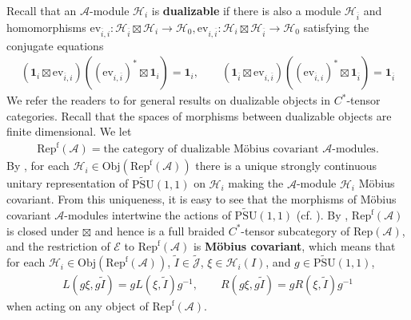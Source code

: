 \documentclass[11pt,b5paper,notitlepage]{article}
\theoremstyle{definition}
\theoremstyle{plain}
\newcommand{\mc}{\mathcal}
\newcommand{\wtd}{\widetilde}
\newcommand{\ovl}{\overline}
\newcommand{\id}{\mathbf{1}}
\newcommand{\ev}{\mathrm{ev}}
\newcommand{\opp}{\mathrm{opp}}
\newcommand{\scr}{\mathscr}
\newcommand{\Jtd}{\widetilde{\mathcal J}}
\newcommand{\RepA}{\mathrm{Rep}(\mathcal A)}
\newcommand{\RepfA}{\mathrm{Rep}^{\mathrm f}(\mathcal A)}
\newcommand{\UPSU}{\widetilde{\mathrm{PSU}}(1,1)}
\newcommand{\Obj}{\mathrm{Obj}}
\numberwithin{equation}{section}
\begin{document}
	
Recall that an $\mc A$-module $\mc H_i$ is \textbf{dualizable} if there is also a module $\mc H_{\ovl i}$ and homomorphisms $\ev_{\ovl i,i}:\mc H_{\ovl i}\boxtimes\mc H_i\rightarrow\mc H_0,\ev_{i,\ovl i}:\mc H_i\boxtimes\mc H_{\ovl i}\rightarrow\mc H_0$ satisfying the conjugate equations
\begin{align}\label{eq22}
(\id_i\boxtimes\ev_{\ovl i,i})((\ev_{i,\ovl i})^*\boxtimes\id_i)=\id_i,\qquad(\id_{\ovl i}\boxtimes\ev_{i,\ovl i})((\ev_{\ovl i,i})^*\boxtimes\id_{\ovl i})=\id_{\ovl i}	
\end{align}
We refer the readers to \cite{LR97,Yam04,BDH14} for general results on dualizable objects in $C^*$-tensor categories. Recall  that the spaces of morphisms between dualizable objects are finite dimensional. We let
\begin{align*}
\RepfA=\text{the category of dualizable M\"obius covariant $\mc A$-modules}.	
\end{align*}
By \cite[Prop. 2.2]{GL96}, for each $\mc H_i\in\Obj(\RepfA)$ there is a unique strongly continuous unitary representation of $\UPSU$ on $\mc H_i$ making the $\mc A$-module $\mc H_i$ M\"obius covariant. From this uniqueness, it is easy to see that the morphisms of M\"obius covariant $\mc A$-modules intertwine the actions of $\UPSU$ (cf. \cite[Lemma B.1]{Gui21b}). By \cite[Sec. B]{Gui21b}, $\RepfA$ is closed under $\boxtimes$ and hence is a full braided $C^*$-tensor subcategory of $\RepA$, and the restriction of $\scr E$ to $\RepfA$ is \textbf{M\"obius covariant}, which means that  for each $\mc H_i\in\Obj(\RepfA)$, $\wtd I\in\Jtd$, $\xi\in\mc H_i(I)$, and $g\in\UPSU$,
\begin{align}
	L(g\xi,g\wtd I)=gL(\xi,\wtd I)g^{-1},\qquad R(g\xi,g\wtd I)=gR(\xi,\wtd I)g^{-1}\label{eq31}	
\end{align}
when acting on any object of $\RepfA$.



	
\end{document}
